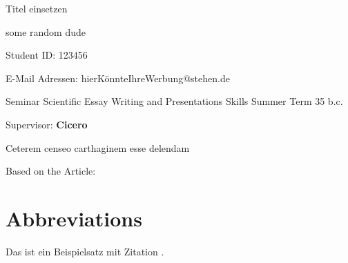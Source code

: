 \documentclass[parskip]{scrartcl}
\makeatletter
\newcommand{\workauthor}{some random dude}
\newcommand{\worktitle}{Titel einsetzen}
\newcommand{\studentid}{123456}
\newcommand{\email}{hierKönnteIhreWerbung@stehen.de}
\newcommand{\workyear}{35 b.c.}
\newcommand{\shortabstract}{Ceterem censeo carthaginem esse delendam}
\newcommand{\supervisor}{Cicero}
\makeatother
\begin{document}
\begin{titlepage}
    {
    {\vspace*{1cm}\Huge \worktitle{}}}
    
    
    
    {\Large \workauthor{}}
    
    Student ID: \studentid{}
    
    E-Mail Adressen: \email{}
    
    
    Seminar Scientific Essay Writing and Presentations Skills Summer Term \workyear{}
    
    Supervisor: \textbf{\supervisor{}}
    
    
    \shortabstract{}
    
    
    Based on the Article:\\
    
    
\end{titlepage}
\begin{abstract}
	Das ist der Abstract, leider aber ohne Inhalt: Hier könnte Ihre Werbung stehen.
\end{abstract}

\tableofcontents
{\setlength{\parskip}{0.2cm}
\section*{Abbreviations}
    \begin{acronym}[LC-MS/MS23]
        
        
        
        
    \end{acronym}
}

\newpage
Das ist ein Beispielsatz mit Zitation \citep{Alberts.2015}.







\end{document}
